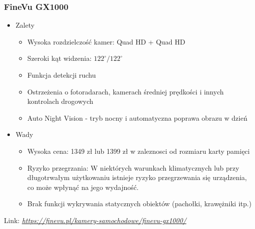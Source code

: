         \subsubsection*{FineVu GX1000}
        \begin{itemize}
            \item Zalety
            \begin{itemize}
                \item Wysoka rozdzielczość kamer: Quad HD + Quad HD
                \item Szeroki kąt widzenia: $122^\circ / 122^\circ$
                \item Funkcja detekcji ruchu 
                \item Ostrzeżenia o fotoradarach, kamerach średniej prędkości i innych kontrolach drogowych
                \item Auto Night Vision - tryb nocny i automatyczna poprawa obrazu w dzień
            \end{itemize}
            \item Wady
            \begin{itemize}
                \item Wysoka cena: 1349 zł lub 1399 zł w zaleznosci od rozmiaru karty pamięci
                \item Ryzyko przegrzania: W niektórych warunkach klimatycznych lub przy długotrwałym 
                użytkowaniu istnieje ryzyko przegrzewania się urządzenia, co może wpłynąć na jego wydajność.
                \item Brak funkcji wykrywania statycznych obiektów (pachołki, krawężniki itp.)
            \end{itemize}
        \end{itemize}

        Link: \textit{\url{https://finevu.pl/kamery-samochodowe/finevu-gx1000/}}
        

